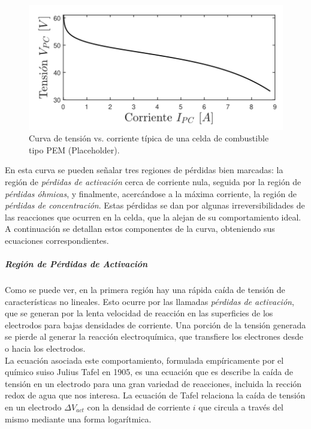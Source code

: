 \begin{figure}[H]
    \centering
    \includegraphics[scale=0.7]{Imagenes/Curva V-I Celda.png}
    \caption{Curva de tensión vs. corriente típica de una celda de combustible tipo PEM (Placeholder).}
    \label{V-I_celda}
\end{figure}

En esta curva se pueden señalar tres regiones de pérdidas bien marcadas: la región de \textit{pérdidas de activación} cerca de corriente nula, seguida por la región de \textit{pérdidas óhmicas}, y finalmente, acercándose a la máxima corriente, la región de \textit{pérdidas de concentración}. Estas pérdidas se dan por algunas irreversibilidades de las reacciones que ocurren en la celda, que la alejan de su comportamiento ideal. A continuación se detallan estos componentes de la curva, obteniendo sus ecuaciones correspondientes.\\

\subparagraph{Región de Pérdidas de Activación}

Como se puede ver, en la primera región hay una rápida caída de tensión de características no lineales. Esto ocurre por las llamadas \textit{pérdidas de activación}, que se generan por la lenta velocidad de reacción en las superficies de los electrodos para bajas densidades de corriente. Una porción de la tensión generada se pierde al generar la reacción electroquímica, que transfiere los electrones desde o hacia los electrodos.\\

La ecuación asociada este comportamiento, formulada empíricamente por el químico suiso Julius Tafel en 1905, es una ecuación que es describe la caída de tensión en un electrodo para una gran variedad de reacciones, incluida la rección redox de agua que nos interesa. La ecuación de Tafel relaciona la caída de tensión en un electrodo $\Delta V_{act}$ con la densidad de corriente $i$ que circula a través del mismo mediante una forma logarítmica.
    
